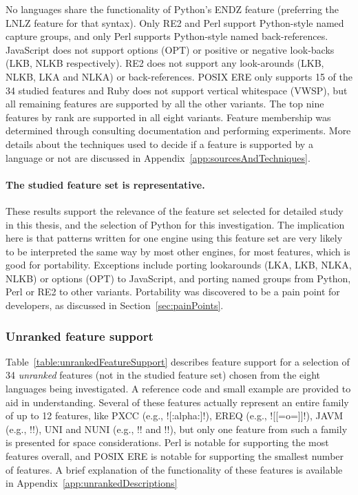 No languages share the functionality of Python's ENDZ feature (preferring the LNLZ feature for that syntax).  Only RE2 and Perl support Python-style named capture groups, and only Perl supports Python-style named back-references.  JavaScript does not support options (OPT) or positive or negative look-backs (LKB, NLKB respectively).  RE2 does not support any look-arounds (LKB, NLKB, LKA and NLKA) or back-references.  POSIX ERE only supports 15 of the 34 studied features and Ruby does not support vertical whitespace (VWSP), but all remaining features are supported by all the other variants.  The top nine features by rank are supported in all eight variants.  Feature membership was determined through consulting documentation and performing experiments.  More details about the techniques used to decide if a feature is supported by a language or not are discussed in Appendix~\ref{app:sourcesAndTechniques}.

\paragraph{The studied feature set is representative.}  These results support the relevance of the feature set selected for detailed study in this thesis, and the selection of Python for this investigation.  The implication here is that patterns written for one engine using this feature set are very likely to be interpreted the same way by most other engines, for most features, which is good for portability.  Exceptions include porting lookarounds (LKA, LKB, NLKA, NLKB) or options (OPT) to JavaScript,  and porting named groups from Python, Perl or RE2 to other variants.  Portability was discovered to be a pain point for developers, as discussed in Section~\ref{sec:painPoints}.

\afterpage{\clearpage}



\subsubsection{Unranked feature support}
Table~\ref{table:unrankedFeatureSupport} describes feature support for a selection of 34 \emph{unranked} features (not in the studied feature set) chosen from the eight languages being investigated.  A reference code and small example are provided to aid in understanding.  Several of these features actually represent an entire family of up to 12 features, like PXCC (e.g., \cverb![:alpha:]!), EREQ (e.g., \cverb![[=o=]]!), JAVM (e.g., \cverb!!), UNI and NUNI (e.g., \cverb!\pL! and \cverb!\PM!), but only one feature from such a family is presented for space considerations.  Perl is notable for supporting the most features overall, and POSIX ERE is notable for supporting the smallest number of features.  A brief explanation of the functionality of these features is available in Appendix~\ref{app:unrankedDescriptions}


